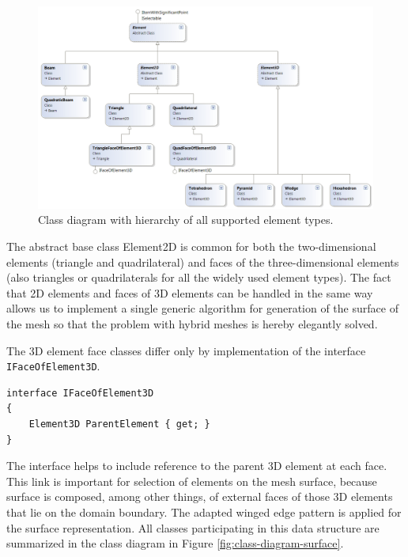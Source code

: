 \begin{figure}[H]
\centering
\includegraphics[width=\textwidth]{figures/appendix-mesh-visualization/figure2}
\decoRule
\caption[Class diagram of element types]{Class diagram with hierarchy of all supported element types.}
\label{fig:class-diagram-elements}
\end{figure}

The abstract base class Element2D is common for both the two-dimensional elements (triangle and quadrilateral) and faces of the three-dimensional elements (also triangles or quadrilaterals for all the widely used element types). The fact that 2D elements and faces of 3D elements can be handled in the same way allows us to implement a single generic algorithm for generation of the surface of the mesh so that the problem with hybrid meshes is hereby elegantly solved.

The 3D element face classes differ only by implementation of the interface \texttt{IFaceOfElement3D}.

\begin{Verbatim}[obeytabs,tabsize=4]
interface IFaceOfElement3D
{
	Element3D ParentElement { get; }
}
\end{Verbatim}

The interface helps to include reference to the parent 3D element at each face. This link is important for selection of elements on the mesh surface, because surface is composed, among other things, of external faces of those 3D elements that lie on the domain boundary. The adapted winged edge pattern is applied for the surface representation. All classes participating in this data structure are summarized in the class diagram in Figure \ref{fig:class-diagram-surface}.

